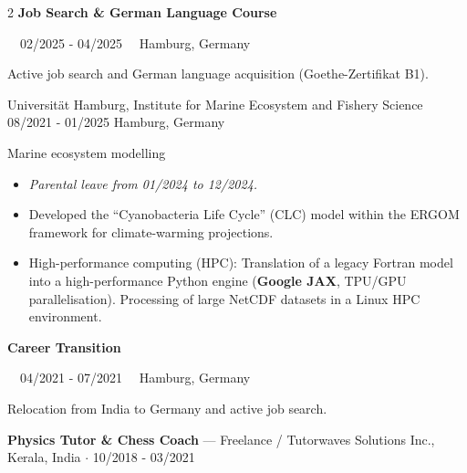 \documentclass{thejus_cv}
\begin{document}
\begin{paracol}{2}
\vspace{1.5em}
{\large\textbf{Job Search \& German Language Course}}\par
{\small\color{cvgray}\faCalendar\ \ 02/2025 - 04/2025 \hspace{0.5cm} \faMapMarker\ \ Hamburg, Germany}\par
\vspace{0.2em}
{\color{cvlightgray}\hdashrule{\linewidth}{0.5pt}{1mm}}\par
\vspace{0.2em}
Active job search and German language acquisition (Goethe-Zertifikat B1).
\vspace{0.3em}

             {Universit\"at Hamburg, Institute for Marine Ecosystem and Fishery Science}
             {08/2021 - 01/2025}
             {Hamburg, Germany}
             {Marine ecosystem modelling
             \begin{itemize}\setlength{\itemsep}{0.05em}
                 \item \textit{Parental leave from 01/2024 to 12/2024.}
                 \item Developed the ``Cyanobacteria Life Cycle'' (CLC) model within the ERGOM framework for climate-warming projections.
                 \item High-performance computing (HPC): Translation of a legacy Fortran model into a high-performance Python engine (\textbf{Google JAX}, TPU/GPU parallelisation). Processing of large NetCDF datasets in a Linux HPC environment.
             \end{itemize}}

\vspace{1.5em}
{\large\textbf{Career Transition}}\par
{\small\color{cvgray}\faCalendar\ \ 04/2021 - 07/2021 \hspace{0.5cm} \faMapMarker\ \ Hamburg, Germany}\par
\vspace{0.2em}
{\color{cvlightgray}\hdashrule{\linewidth}{0.5pt}{1mm}}\par
\vspace{0.2em}
Relocation from India to Germany and active job search.
\vspace{0.3em}

\textbf{Physics Tutor \& Chess Coach} --- Freelance / Tutorwaves Solutions Inc., Kerala, India $\cdot$ 10/2018 - 03/2021\par


\end{paracol}
\end{document}
